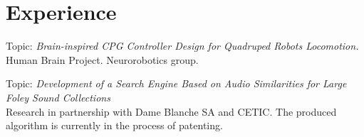 \documentclass[a4paper]{deedy-resume} %
\begin{document}

\lastupdated %

\sectionspace %
\vspace{10pt}

\section{Experience}
\vspace{5pt}
Topic: \textit{Brain-inspired CPG Controller Design for Quadruped Robots Locomotion.}\\
Human Brain Project. Neurorobotics group.\\

\vspace{10pt}


Topic: \textit{Development of a Search Engine Based on Audio Similarities for Large Foley Sound Collections}\\
Research in partnership with Dame Blanche SA  and CETIC. The produced algorithm is currently in the process of patenting.

\vspace{10pt}
\end{document}
